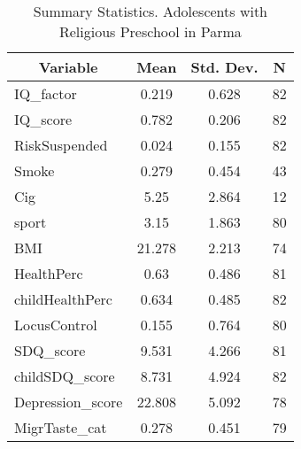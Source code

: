 
\begin{table}[htbp]\centering \caption{Summary Statistics. Adolescents with Religious Preschool in Parma \label{bothAdolmaternaReliParma}}
\begin{tabular}{l c c  c}\hline\hline
\multicolumn{1}{c}{\textbf{Variable}} & \textbf{Mean}
 & \textbf{Std. Dev.} & \textbf{N}\\ \hline
IQ\_factor & 0.219 & 0.628  & 82\\
IQ\_score & 0.782 & 0.206  & 82\\
RiskSuspended & 0.024 & 0.155  & 82\\
Smoke & 0.279 & 0.454  & 43\\
Cig & 5.25 & 2.864  & 12\\
sport & 3.15 & 1.863  & 80\\
BMI & 21.278 & 2.213  & 74\\
HealthPerc & 0.63 & 0.486  & 81\\
childHealthPerc & 0.634 & 0.485  & 82\\
LocusControl & 0.155 & 0.764  & 80\\
SDQ\_score & 9.531 & 4.266  & 81\\
childSDQ\_score & 8.731 & 4.924  & 82\\
Depression\_score & 22.808 & 5.092  & 78\\
MigrTaste\_cat & 0.278 & 0.451  & 79\\
\hline\end{tabular}
\end{table}
